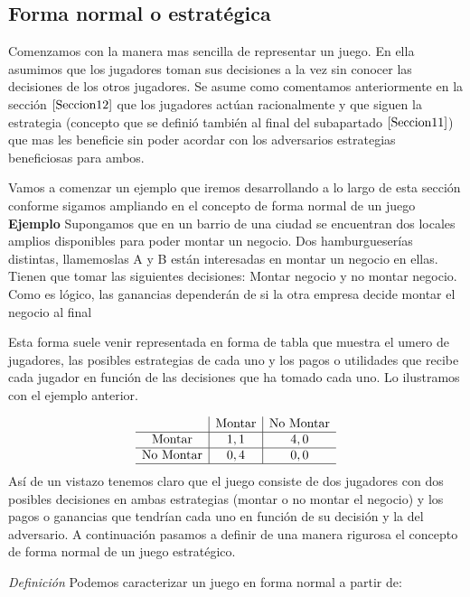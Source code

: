 \documentclass[12pt,a4paper,]{book}
\numberwithin{dummy}{section}
\theoremstyle{ocrenumbox}
\theoremstyle{blacknumex}
\theoremstyle{blacknumbox}
\theoremstyle{ocrenum}
\theoremstyle{ocrenum}
\begin{document}
\hypertarget{Seccion221}{%
\subsection{Forma normal o estratégica}\label{Seccion221}}

Comenzamos con la manera mas sencilla de representar un juego. En ella
asumimos que los jugadores toman sus decisiones a la vez sin conocer las
decisiones de los otros jugadores. Se asume como comentamos
anteriormente en la sección \(\ref{Seccion12}\) que los jugadores actúan
racionalmente y que siguen la estrategia (concepto que se definió
también al final del subapartado \(\ref{Seccion11}\)) que mas les
beneficie sin poder acordar con los adversarios estrategias beneficiosas
para ambos.

Vamos a comenzar un ejemplo que iremos desarrollando a lo largo de esta
sección conforme sigamos ampliando en el concepto de forma normal de un
juego \textbf{Ejemplo} Supongamos que en un barrio de una ciudad se
encuentran dos locales amplios disponibles para poder montar un negocio.
Dos hamburgueserías distintas, llamemoslas A y B están interesadas en
montar un negocio en ellas. Tienen que tomar las siguientes decisiones:
Montar negocio y no montar negocio. Como es lógico, las ganancias
dependerán de si la otra empresa decide montar el negocio al final

Esta forma suele venir representada en forma de tabla que muestra el
umero de jugadores, las posibles estrategias de cada uno y los pagos o
utilidades que recibe cada jugador en función de las decisiones que ha
tomado cada uno. Lo ilustramos con el ejemplo anterior.

\[
\begin{array}{c|c|c}
 & \text{Montar} & \text{No Montar} \\
\hline
\text{Montar} & 1,1 & 4,0 \\
\hline
\text{No Montar} & 0,4 & 0,0 \\
\hline
\end{array}
\] Así de un vistazo tenemos claro que el juego consiste de dos
jugadores con dos posibles decisiones en ambas estrategias (montar o no
montar el negocio) y los pagos o ganancias que tendrían cada uno en
función de su decisión y la del adversario. A continuación pasamos a
definir de una manera rigurosa el concepto de forma normal de un juego
estratégico.

\emph{Definición} Podemos caracterizar un juego en forma normal a partir
de:
\end{document}
